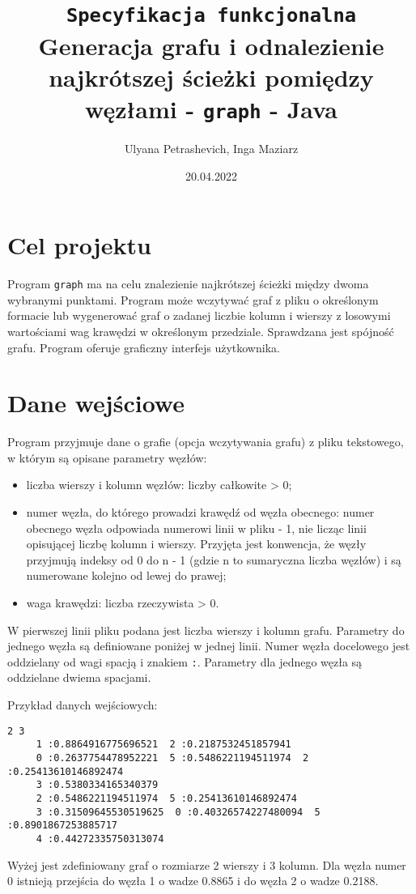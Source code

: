 \documentclass[]{article}
\title{\texttt{Specyfikacja funkcjonalna}\\Generacja grafu i odnalezienie najkrótszej ścieżki pomiędzy węzłami - \texttt{graph} - Java}
\author{Ulyana Petrashevich, Inga Maziarz}
\date{20.04.2022}
\begin{document}
\maketitle
\tableofcontents
\thispagestyle{empty}
\newpage
\section{Cel projektu}\label{header-n231}

Program \texttt{graph} ma na celu znalezienie najkrótszej ścieżki między dwoma wybranymi punktami. Program może wczytywać graf z pliku o określonym formacie lub wygenerować graf o zadanej liczbie kolumn i wierszy z losowymi wartościami wag krawędzi w określonym przedziale. Sprawdzana jest spójność grafu. Program oferuje graficzny interfejs użytkownika.

\section{Dane wejściowe}\label{header-n233}

Program przyjmuje dane o grafie (opcja wczytywania grafu) z pliku tekstowego, w którym są opisane parametry węzłów:

\begin{itemize}
\item
  liczba wierszy i kolumn węzłów: liczby całkowite \textgreater{} 0;
\item
  numer węzła, do którego prowadzi krawędź od węzła obecnego: numer obecnego węzła odpowiada numerowi linii w pliku - 1, nie licząc linii opisującej liczbę kolumn i wierszy. Przyjęta jest konwencja, że węzły przyjmują indeksy od 0 do n - 1 (gdzie n to sumaryczna liczba węzłów) i są numerowane kolejno od lewej do prawej; 
\item
  waga krawędzi: liczba rzeczywista \textgreater{} 0.
\end{itemize}

W pierwszej linii pliku podana jest liczba wierszy i kolumn grafu. Parametry do jednego węzła są definiowane poniżej w jednej linii. Numer węzła docelowego jest oddzielany od wagi spacją i znakiem \texttt{:}. Parametry dla jednego węzła są oddzielane dwiema spacjami.

Przykład danych wejściowych:

\begin{verbatim}
2 3
	 1 :0.8864916775696521  2 :0.2187532451857941 
	 0 :0.2637754478952221  5 :0.5486221194511974  2 :0.25413610146892474
	 3 :0.5380334165340379
	 2 :0.5486221194511974  5 :0.25413610146892474
	 3 :0.31509645530519625  0 :0.40326574227480094  5 :0.8901867253885717
	 4 :0.44272335750313074
\end{verbatim}
Wyżej jest zdefiniowany graf o rozmiarze 2 wierszy i 3 kolumn. Dla węzła numer 0 istnieją przejścia do węzła 1 o wadze 0.8865 i do węzła 2 o wadze 0.2188.
\end{document}
